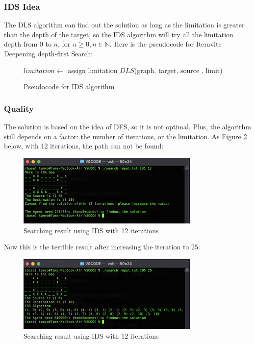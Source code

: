 \documentclass{assignment}
\begin{document}
\subsubsection{IDS Idea}

The DLS algorithm can find out the solution as long as the limitation is greater than the depth of the target, so the IDS algorithm will try all the limitation depth from 0 to $n$, for $n \geq 0, n \in \mathbb{N}$. Here is the pseudocode for Iteravite Deepening depth-first Search:

\begin{figure}[htbp]
    \centering
    \begin{mdframed}
      \begin{algorithmic}
        \STATE $limitation \gets$ assign limitation
        	\STATE $DLS$(graph, target, source , limit)
        \ENDFOR
      \end{algorithmic}
    \end{mdframed}
    \caption{Pseudocode for IDS algorithm}
    \label{fig:fig8}
 \end{figure}
 
\subsubsection{Quality}

The solution is based on the idea of DFS, so it is not optimal. Plus, the algorithm still depends on a factor: the number of iterations, or the limitation. As Figure \ref{fig:fig9} below, with 12 iterations, the path can not be found:

\begin{figure}[h]
    \centering
    \includegraphics[width=0.8\textwidth]{./assets/IDS1.png}
    \caption{Searching result using IDS with 12 iterations}
    \label{fig:fig9}
\end{figure}

Now this is the terrible result after increasing the iteration to 25:

\begin{figure}[h]
    \centering
    \includegraphics[width=0.8\textwidth]{./assets/IDS2.png}
    \caption{Searching result using IDS with 12 iterations}
    \label{fig:fig10}
\end{figure}
\end{document}
